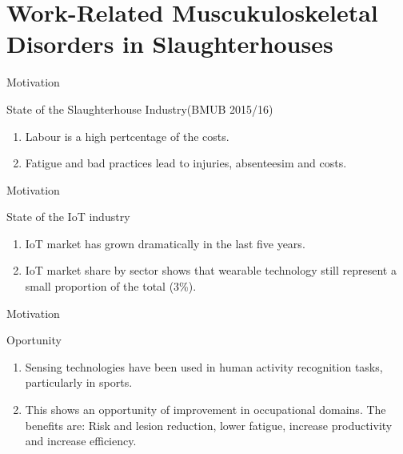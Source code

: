 
\section{Work-Related Muscukuloskeletal Disorders in Slaughterhouses}
\frame{\sectionpage}

\begin{frame}{Motivation}
    \begin{alertblock}{State of the Slaughterhouse Industry\hfill (BMUB 2015/16)}
    \begin{enumerate}%
    \item Labour is a high pertcentage of the costs.
    \item Fatigue and bad practices lead to injuries, absenteesim and costs.
    \end{enumerate}
    \end{alertblock}
\end{frame}


\begin{frame}{Motivation}
    \begin{alertblock}{State of the IoT industry}
    \begin{enumerate}%
    \item IoT market has grown dramatically in the last five years.
    \item IoT market share by sector shows that wearable technology still represent a small proportion of the total (3\%).
    \end{enumerate}
    \end{alertblock}
\end{frame}

\begin{frame}{Motivation}
    \begin{alertblock}{Oportunity}
    \begin{enumerate}%
    \item Sensing technologies have been used in human activity recognition tasks, particularly in sports.
    \item This shows an opportunity of improvement in occupational domains. The benefits are: Risk and lesion reduction, lower fatigue, increase productivity and increase efficiency.
    \end{enumerate}
    \end{alertblock}
\end{frame}


